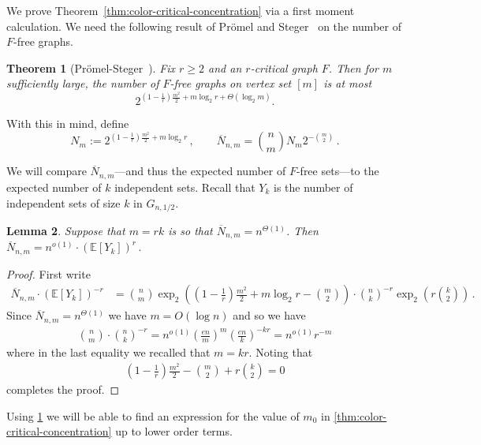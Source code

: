 \documentclass[11pt]{article}
\newtheorem{theorem}{Theorem}
\newtheorem{lemma}[theorem]{Lemma}
\theoremstyle{definition}
\theoremstyle{remark}
\newcommand{\E}{\mathbb{E}}
\begin{document}
We prove Theorem~\ref{thm:color-critical-concentration} via a first moment calculation.  We need the following result of Pr\"omel and Steger~\cite{PS2} on the number of $F$-free graphs.


\begin{theorem} [Pr\"omel-Steger~\cite{PS2}] \label{thm:PSFfree}
Fix $r \ge 2$ and an $r$-critical graph $F$. Then for $m$ sufficiently large, the number of $F$-free graphs on vertex set $[m]$ is at most
$$2^{\left(1-\frac1r\right)\frac{m^2}{2} + m\log_2r +\Theta(\log_2m)}.$$
\end{theorem}

With this in mind, define $$N_m := 2^{\left(1-\frac1r\right)\frac{m^2}{2} + m\log_2r}\,,\qquad \overline{N}_{n,m} = \binom{n}{m} N_m 2^{-\binom{m}{2}}\,.$$


We will compare $\overline{N}_{n,m}$---and thus the expected number of $F$-free sets---to the expected number of $k$ independent sets.  Recall that $Y_k$ is the number of independent sets of size $k$ in $G_{n,1/2}.$

\begin{lemma}\label{lem:compare-to-IS}
    Suppose that $m = r k$ is so that $\overline{N}_{n,m} = n^{\Theta(1)}$.  Then $\overline{N}_{n,m} = n^{o(1)}\cdot (\E [Y_k])^r\,.$
\end{lemma}
\begin{proof}
First write \begin{align*}
    \overline{N}_{n,m} \cdot (\E [Y_k])^{-r} &=\binom{n}{m} \exp_2\left( \left(1 - \frac{1}{r} \right)\frac{m^2}{2} + m \log_2 r - \binom{m}{2}\right) \cdot \binom{n}{k}^{-r}\exp_2\left(r \binom{k}{2} \right)\,.
\end{align*}
 Since  $\overline{N}_{n,m} = n^{\Theta(1)}$ we have $m = O(\log n)$ and so we have \begin{align*}
    \binom{n}{m} \cdot \binom{n}{k}^{-r} = n^{o(1)} \left(\frac{e n}{m} \right)^m \left( \frac{e n }{k} \right)^{-kr} = n^{o(1)} r^{-m}
\end{align*}
where in the last equality we recalled that $m = kr$.  Noting that \begin{align*}
    \left(1 - \frac{1}{r} \right)\frac{m^2}{2}  - \binom{m}{2} + r \binom{k}{2} = 0
\end{align*}
completes the proof.
\end{proof}

Using \cref{thm:PSFfree} we will be able to find an expression for the value of $m_0$ in \cref{thm:color-critical-concentration} up to lower order terms.
\end{document}
